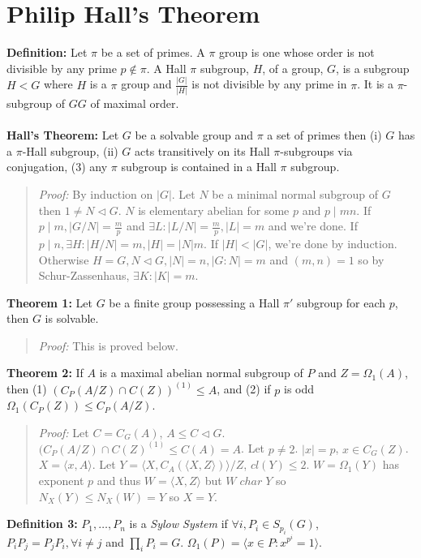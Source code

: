 \section {Philip Hall's Theorem} 
{\bf Definition:} Let $\pi$ be a set of primes. A $\pi$ group is one whose order is not divisible by any prime $p \notin \pi$.
A Hall $\pi$ subgroup, $H$, of a group, $G$, is a subgroup $H<G$ where $H$ is a $\pi$ group and ${\frac {|G|} {|H|}}$ is not divisible by any
prime in $\pi$.  It is a $\pi$-subgroup of $GG$ of maximal order.
\\
\\
{\bf Hall's Theorem:} 
Let $G$ be a solvable group and $\pi$ a set of primes then (i) $G$ has a $\pi$-Hall
subgroup, (ii) $G$ acts transitively on its Hall $\pi$-subgroups via conjugation, 
(3) any $\pi$ subgroup is contained in a Hall $\pi$ subgroup.
\begin{quote}
\emph{Proof:} By induction on $|G|$.  Let $N$ be a minimal normal subgroup of $G$ then
$1 \ne N \lhd G$.  $N$ is elementary abelian for some $p$ and $p \mid mn$.   If
$p \mid m, |G/N|= {\frac m p}$ and $\exists L: |L/N|= {\frac m p}, |L|= m$ and we're done.
If $p \mid n, \exists H: |H/N|=m, |H|= |N|m$.  If $|H| < |G|$, we're done by induction.
Otherwise $H=G, N \lhd G, |N|= n, |G:N|=m$ and $(m,n)=1$ so by Schur-Zassenhaus,
$\exists K: |K|=m$.
\end{quote}
{\bf Theorem 1: } Let $G$ be a finite group possessing a Hall $\pi'$ subgroup for each $p$, then $G$ 
is solvable. 
\begin{quote}
\emph{Proof:}  
This is proved below.
\end{quote}
{\bf Theorem 2:}
If $A$ is a maximal abelian normal subgroup of $P$ and $Z=\Omega_1(A)$, then
(1) $(C_P(A/Z) \cap C(Z))^{(1)} \le A$, and (2) if $p$ is odd $\Omega_1(C_P(Z)) \le C_P(A/Z)$.
\begin{quote}
\emph{Proof:}  
Let $C= C_G(A)$, $A \le C \lhd G$.  $(C_P(A/Z) \cap C(Z)^{(1)} \le C(A)=A$.  Let 
$p \ne 2$.  $|x|=p$, $x \in C_G(Z)$.  $X= \langle x, A \rangle $.  Let 
$Y= \langle X, C_A( \langle X,Z \rangle) \rangle /Z$,
$cl(Y) \le 2$.  $W= \Omega_1(Y)$ has exponent $p$ and thus $W= \langle X, Z \rangle $ but
$W \; char \; Y$ so $N_X(Y) \le N_X(W)= Y$ so $X=Y$.
\end{quote}
{\bf Definition 3:} 
$P_1, \ldots , P_n$ is a \emph{Sylow System} if $\forall i, P_i \in S_{p_i}(G)$,
$P_i P_j = P_j P_i, \forall i \ne j$ and $\prod_i P_i = G$.  
$\Omega_1(P)= \langle x \in P: x^{p^i}=1 \rangle $.
\\
